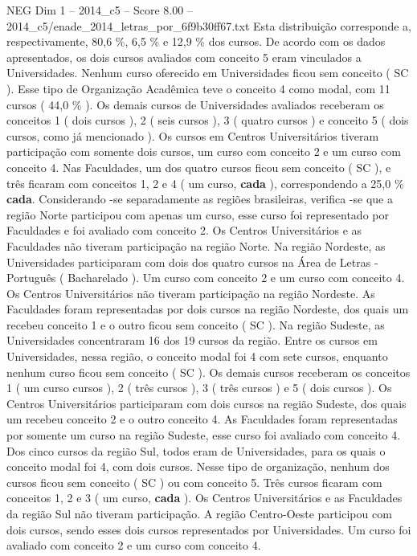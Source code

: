 \begin{textsample}{NEG Dim 1 – 2014\_c5 – Score 8.00 – 2014\_c5/enade\_2014\_letras\_por\_6f9b30ff67.txt}
Esta distribuição corresponde a, respectivamente, 80,6 \%, 6,5 \% e 12,9 \% dos cursos.
De acordo com os dados apresentados, os dois cursos avaliados com conceito 5 eram vinculados a Universidades.
Nenhum curso oferecido em Universidades ficou sem conceito ( SC ).
Esse tipo de Organização Acadêmica teve o conceito 4 como modal, com 11 cursos ( 44,0 \% ).
Os demais cursos de Universidades avaliados receberam os conceitos 1 ( dois cursos ), 2 ( seis cursos ), 3 ( quatro cursos ) e conceito 5 ( dois cursos, como já mencionado ).
Os cursos em Centros Universitários tiveram participação com somente dois cursos, um curso com conceito 2 e um curso com conceito 4.
Nas Faculdades, um dos quatro cursos ficou sem conceito ( SC ), e três ficaram com conceitos 1, 2 e 4 ( um curso, \textbf{cada} ), correspondendo a 25,0 \% \textbf{cada}.
Considerando -se separadamente as regiões brasileiras, verifica -se que a região Norte participou com apenas um curso, esse curso foi representado por Faculdades e foi avaliado com conceito 2.
Os Centros Universitários e as Faculdades não tiveram participação na região Norte.
Na região Nordeste, as Universidades participaram com dois dos quatro cursos na Área de Letras - Português ( Bacharelado ).
Um curso com conceito 2 e um curso com conceito 4.
Os Centros Universitários não tiveram participação na região Nordeste.
As Faculdades foram representadas por dois cursos na região Nordeste, dos quais um recebeu conceito 1 e o outro ficou sem conceito ( SC ).
Na região Sudeste, as Universidades concentraram 16 dos 19 cursos da região.
Entre os cursos em Universidades, nessa região, o conceito modal foi 4 com sete cursos, enquanto nenhum curso ficou sem conceito ( SC ).
Os demais cursos receberam os conceitos 1 ( um curso cursos ), 2 ( três cursos ), 3 ( três cursos ) e 5 ( dois cursos ).
Os Centros Universitários participaram com dois cursos na região Sudeste, dos quais um recebeu conceito 2 e o outro conceito 4.
As Faculdades foram representadas por somente um curso na região Sudeste, esse curso foi avaliado com conceito 4.
Dos cinco cursos da região Sul, todos eram de Universidades, para os quais o conceito modal foi 4, com dois cursos.
Nesse tipo de organização, nenhum dos cursos ficou sem conceito ( SC ) ou com conceito 5.
Três cursos ficaram com conceitos 1, 2 e 3 ( um curso, \textbf{cada} ).
Os Centros Universitários e as Faculdades da região Sul não tiveram participação.
A região Centro-Oeste participou com dois cursos, sendo esses dois cursos representados por Universidades.
Um curso foi avaliado com conceito 2 e um curso com conceito 4.

\end{textsample}
